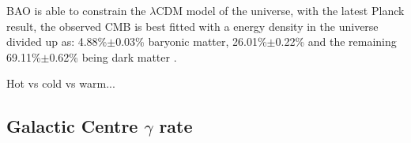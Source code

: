 \par
BAO is able to constrain the $\lambda$CDM model of the universe, with the latest Planck result, the observed CMB is best fitted with a energy density in the universe divided up as: 4.88\%$\pm$0.03\% baryonic matter, 26.01\%$\pm$0.22\% and the remaining 69.11\%$\pm$0.62\% being dark matter \cite{plank_result_ref}.

\par
Hot vs cold vs warm... 




\subsection{Galactic Centre $\gamma$ rate}
\par


